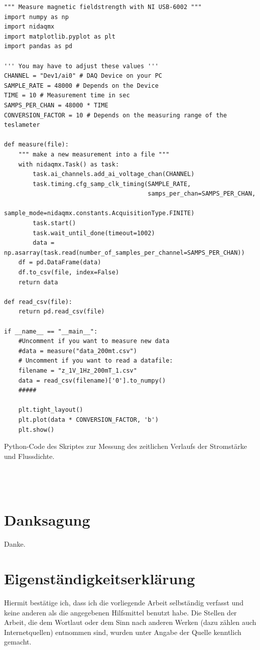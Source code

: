 \documentclass[page,pdftex,12pt,a4paper,twoside,openright]{scrbook}
\begin{document}
\begin{listing}[htbp]
\begin{verbatim}
""" Measure magnetic fieldstrength with NI USB-6002 """
import numpy as np
import nidaqmx
import matplotlib.pyplot as plt
import pandas as pd

''' You may have to adjust these values '''
CHANNEL = "Dev1/ai0" # DAQ Device on your PC
SAMPLE_RATE = 48000 # Depends on the Device
TIME = 10 # Measurement time in sec
SAMPS_PER_CHAN = 48000 * TIME 
CONVERSION_FACTOR = 10 # Depends on the measuring range of the teslameter

def measure(file):
    """ make a new measurement into a file """
    with nidaqmx.Task() as task:
        task.ai_channels.add_ai_voltage_chan(CHANNEL)
        task.timing.cfg_samp_clk_timing(SAMPLE_RATE,
                                        samps_per_chan=SAMPS_PER_CHAN,
                                        sample_mode=nidaqmx.constants.AcquisitionType.FINITE)
        task.start()
        task.wait_until_done(timeout=1002)
        data = np.asarray(task.read(number_of_samples_per_channel=SAMPS_PER_CHAN))
    df = pd.DataFrame(data)
    df.to_csv(file, index=False)
    return data

def read_csv(file):
    return pd.read_csv(file)

if __name__ == "__main__":
    #Uncomment if you want to measure new data
    #data = measure("data_200mt.csv")
    # Uncomment if you want to read a datafile:
    filename = "z_1V_1Hz_200mT_1.csv"
    data = read_csv(filename)['0'].to_numpy()
    #####

    plt.tight_layout()
    plt.plot(data * CONVERSION_FACTOR, 'b')
    plt.show()
\end{verbatim}
\caption{\label{list:code}
Python-Code des Skriptes zur Messung des zeitlichen Verlaufs der Stromstärke und Flussdichte.}
\end{listing}

\chapter*{}
\label{sec:org45aacb2}
\printbibliography\\
\chapter*{Danksagung}
\label{sec:org9cca2fe}
Danke.\\
\chapter*{Eigenständigkeitserklärung}
\label{sec:orgf330fe8}
Hiermit bestätige ich, dass ich die vorliegende Arbeit selbständig verfasst und keine anderen als die angegebenen Hilfsmittel benutzt habe. Die Stellen der Arbeit, die dem Wortlaut oder dem Sinn nach anderen Werken (dazu zählen auch Internetquellen) entnommen sind, wurden unter Angabe der Quelle kenntlich gemacht. \\
\end{document}
